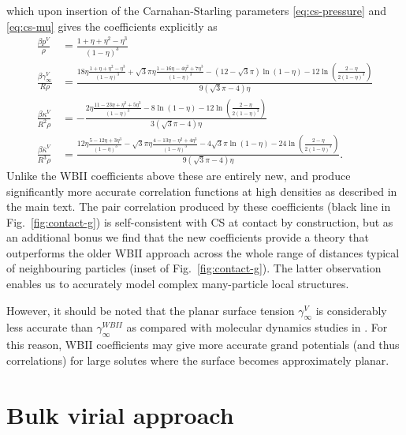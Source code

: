 \documentclass[11pt]{report}
\begin{document}
which upon insertion of the Carnahan-Starling parameters \eqref{eq:cs-pressure} and \eqref{eq:cs-mu} gives the coefficients explicitly as
\begin{subequations}
  \begin{align}
    \frac{\beta p^{V}}{\rho} &=
    \frac{1 + \eta + \eta^2 - \eta^3}{(1-\eta)^3} \\
    \frac{\beta \gamma_\infty^{V}}{R\rho} &=
    \frac{ 18\eta \frac{1 + \eta + \eta^2 - \eta^3}{(1-\eta)^3}
      + \sqrt{3}\pi\eta \frac{1 - 16\eta - 4\eta^2 + 7\eta^3}{(1-\eta)^3}
      - (12 - \sqrt{3}\pi) \ln{(1-\eta)}
      - 12\ln{\left( \frac{2 - \eta}{2(1-\eta)^3} \right)} }
    {9(\sqrt{3}\pi - 4) \eta} \\
    \frac{\beta \kappa^{V}}{R^2\rho} &= -
    \frac{ 2\eta \frac{11 - 23\eta + \eta^2 + 5\eta^3}{(1-\eta)^3}
      - 8 \ln{(1-\eta)}
      - 12\ln{\left( \frac{2 - \eta}{2(1-\eta)^3} \right)} }
    {3(\sqrt{3}\pi - 4) \eta} \\
    \frac{\beta \overline{\kappa}^{V}}{R^3\rho} &=
    \frac{ 12\eta \frac{5 - 12\eta + 3\eta^3}{(1-\eta)^3}
      - \sqrt{3}\pi\eta \frac{4 - 13\eta - \eta^2 + 4\eta^3}{(1-\eta)^3}
      - 4\sqrt{3}\pi \ln{(1-\eta)}
      - 24\ln{\left( \frac{2 - \eta}{2(1-\eta)^3} \right)} }
    {9(\sqrt{3}\pi - 4) \eta}.
  \end{align}
\end{subequations}
Unlike the WBII coefficients above these are entirely new, and produce significantly more accurate correlation functions at high densities as described in the main text.
The pair correlation produced by these coefficients (black line in Fig.\ \ref{fig:contact-g}) is self-consistent with CS at contact by construction, but as an additional bonus we find that the new coefficients provide a theory that outperforms the older WBII approach across the whole range of distances typical of neighbouring particles (inset of Fig.\ \ref{fig:contact-g}).
The latter observation enables us to accurately model complex many-particle local structures.

However, it should be noted that the planar surface tension $\gamma_\infty^{V}$ is considerably less accurate than $\gamma_\infty^{WBII}$ as compared with molecular dynamics studies in \cite{Davidchack2016}.
For this reason, WBII coefficients may give more accurate grand potentials (and thus correlations) for large solutes where the surface becomes approximately planar.

\section{Bulk virial approach}
\end{document}
